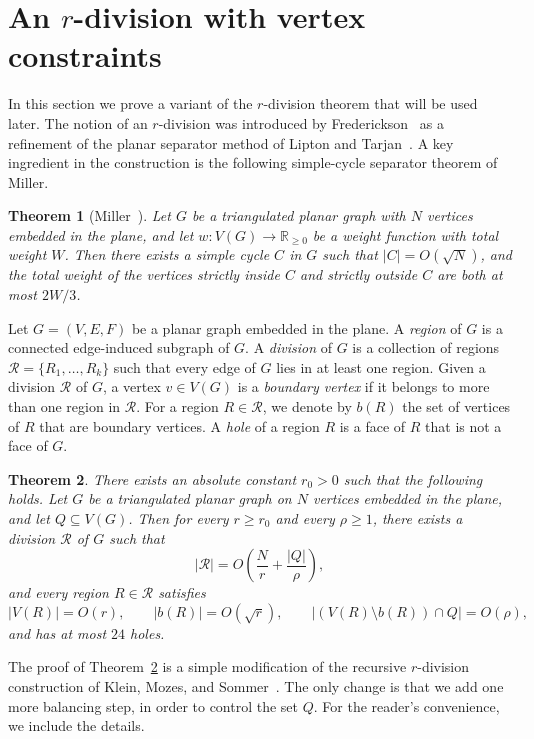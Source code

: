 \documentclass[11pt]{article}
\theoremstyle{plain}
\newtheorem{theorem}{Theorem}[section]
\theoremstyle{definition}
\theoremstyle{remark}
\begin{document}
\section{An $r$-division with vertex constraints}

In this section we prove a variant of the $r$-division theorem that will be used later. The notion of an $r$-division was introduced by Frederickson~\cite{Fre87} as a refinement of the planar separator method of Lipton and Tarjan~\cite{LiptonTarjan1979}. A key ingredient in the construction is the following simple-cycle separator theorem of Miller.

\begin{theorem}[Miller~\cite{Miller1986}]\label{cycle}
Let $G$ be a triangulated planar graph with $N$ vertices embedded in the plane, and let $w:V(G)\to \mathbb R_{\ge 0}$ be a weight function with total weight $W$. Then there exists a simple cycle $C$ in $G$ such that $|C|=O(\sqrt N)$, and the total weight of the vertices strictly inside $C$ and strictly outside $C$ are both at most $2W/3$.
\end{theorem}

Let $G=(V,E,F)$ be a planar graph embedded in the plane. A \emph{region} of $G$ is a connected edge-induced subgraph of $G$. A \emph{division} of $G$ is a collection of regions $\mathcal R=\{R_1,\ldots,R_k\}$ such that every edge of $G$ lies in at least one region. Given a division $\mathcal R$ of $G$, a vertex $v\in V(G)$ is a \emph{boundary vertex} if it belongs to more than one region in $\mathcal R$. For a region $R\in \mathcal R$, we denote by $b(R)$ the set of vertices of $R$ that are boundary vertices. A \emph{hole} of a region \(R\) is a face of \(R\) that is not a face of \(G\).

\begin{theorem}\label{thm:mixed}
There exists an absolute constant \(r_0>0\) such that the following holds. Let \(G\) be a triangulated planar graph on \(N\) vertices embedded in the plane, and let \(Q\subseteq V(G)\). Then for every \(r\ge r_0\) and every \(\rho\ge 1\), there exists a division \(\mathcal R\) of \(G\) such that
\[
|\mathcal R|=O\!\left(\frac{N}{r}+\frac{|Q|}{\rho}\right),
\]
and every region \(R\in\mathcal R\) satisfies
\[
|V(R)|=O(r),\qquad |b(R)|=O(\sqrt r),\qquad |(V(R)\setminus b(R))\cap Q|=O(\rho),
\]
and has at most \(24\) holes.
\end{theorem}

\noindent The proof of Theorem~\ref{thm:mixed} is a simple modification of the recursive
$r$-division construction of Klein, Mozes, and Sommer~\cite{KMS13}. The only
change is that we add one more balancing step, in order to control the set \(Q\).
For the reader's convenience, we include the details.
\end{document}
